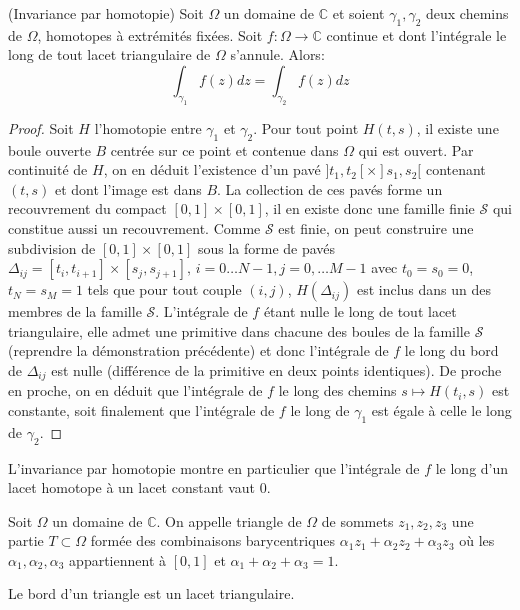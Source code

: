 \begin{fthm}(Invariance par homotopie)
Soit $\Omega$ un domaine de $\mathbb{C}$ et soient $\gamma_1, \gamma_2$ deux
chemins de $\Omega$, homotopes à extrémités fixées. Soit $f \colon
\Omega \to \mathbb{C}$ continue et dont l'intégrale le long de tout lacet
triangulaire de $\Omega$ s'annule. Alors:
\[
\int_{\gamma_1} f(z) dz = \int_{\gamma_2} f(z) dz
 \]
\end{fthm}

\begin{proof}
 Soit $H$ l'homotopie entre $\gamma_1$ et $\gamma_2$. Pour tout
point $H(t,s)$, il existe une boule ouverte $B$ centrée sur ce point et contenue
dans $\Omega$ qui est ouvert. Par continuité de $H$, on en déduit l'existence
d'un pavé $]t_1,t_2[\times ]s_1,s_2[$ contenant $(t,s)$ et dont l'image est dans
$B$. La collection de ces pavés forme un recouvrement du compact
$[0,1]\times[0,1]$, il en existe donc une famille finie $\mathcal{S}$ qui
constitue aussi un recouvrement. Comme $\mathcal{S}$ est finie, on peut
construire une subdivision de $[0,1]\times[0,1]$ sous la forme de pavés
$\Delta_{ij}=[t_i, t_{i+1}]\times [s_j,s_{j+1}], \, i=0\dots N-1, j=0,\dots M-1$
avec $t_0=s_0=0$, $t_N=s_M=1$ tels que pour tout couple $(i,j)$,
$H(\Delta_{ij})$ est inclus dans un des membres de la famille $\mathcal{S}$. 
L'intégrale de $f$ étant nulle le long de tout lacet triangulaire, elle admet
une primitive dans chacune des boules de la famille $\mathcal{S}$ (reprendre la
démonstration précédente) et donc l'intégrale de $f$ le long du bord de
$\Delta_{ij}$ est nulle (différence de la primitive en deux points identiques).
De proche en proche, on en déduit que l'intégrale de $f$ le long des chemins $s \mapsto
H(t_i,s)$ est constante, soit finalement que l'intégrale de $f$ le long de
$\gamma_1$ est égale à celle le long de $\gamma_2$.
\end{proof}
L'invariance par homotopie montre en particulier que l'intégrale de $f$ le long
d'un lacet homotope à un lacet constant vaut $0$.

\begin{fdefn}
Soit $\Omega$ un domaine de $\mathbb{C}$. On appelle triangle de $\Omega$ de
sommets $z_1,z_2,z_3$ une partie $T \subset \Omega$ formée des combinaisons
barycentriques $\alpha_1 z_1 + \alpha_2 z_2 + \alpha_3 z_3$ où les
$\alpha_1,\alpha_2,\alpha_3$ appartiennent à $[0,1]$ et
$\alpha_1+\alpha_2+\alpha_3=1$.
\end{fdefn}

Le bord d'un triangle est un lacet triangulaire.

